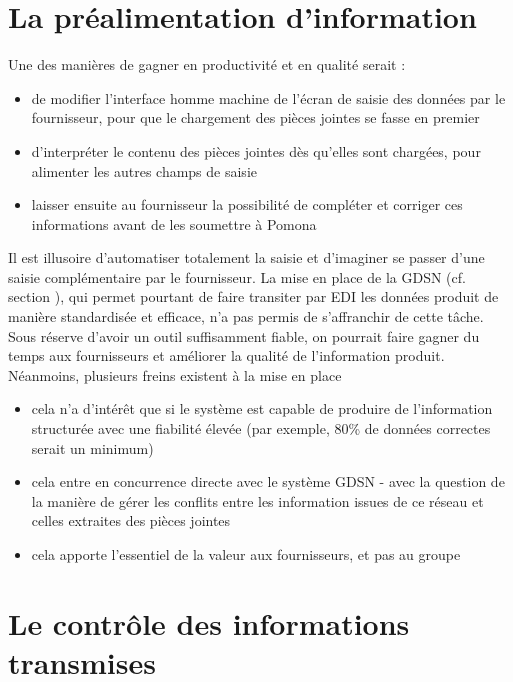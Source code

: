         \section{La préalimentation d'information}
        Une des manières de gagner en productivité et en qualité serait :
        \begin{itemize}
            \item de modifier l'interface homme machine de l'écran de saisie des données par le fournisseur, pour que le chargement des pièces jointes se fasse en premier
            \item d'interpréter le contenu des pièces jointes dès qu'elles sont chargées, pour alimenter les autres champs de saisie
            \item laisser ensuite au fournisseur la possibilité de compléter et corriger ces informations avant de les soumettre à Pomona
        \end{itemize} 
        Il est illusoire d'automatiser totalement la saisie et d'imaginer se passer d'une saisie complémentaire par le fournisseur.
        La mise en place de la GDSN (cf. section ), qui permet pourtant de faire transiter par EDI les données produit de manière standardisée et efficace, n'a pas permis de s'affranchir de cette tâche.
        Sous réserve d'avoir un outil suffisamment fiable, on pourrait faire gagner du temps aux fournisseurs et améliorer la qualité de l'information produit.
        Néanmoins, plusieurs freins existent à la mise en place 
        \begin{itemize}
            \item cela n'a d'intérêt que si le système est capable de produire de l'information structurée avec une fiabilité élevée (par exemple, 80\% de données correctes serait un minimum)
            \item cela entre en concurrence directe avec le système GDSN - avec la question de la manière de gérer les conflits entre les information issues de ce réseau et celles extraites des pièces jointes
            \item cela apporte l'essentiel de la valeur aux fournisseurs, et pas au groupe
        \end{itemize}

        \section{Le contrôle des informations transmises}

